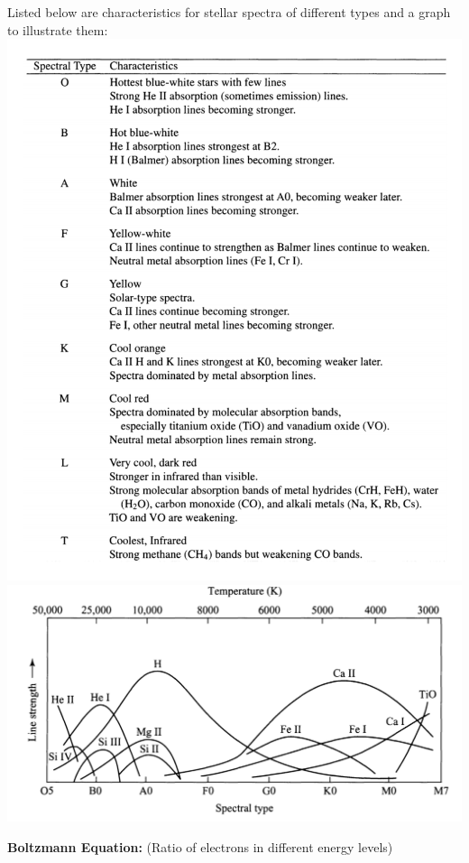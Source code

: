 \documentclass[12pt]{article}
\begin{document}
Listed below are characteristics for stellar spectra of different types and a graph to illustrate them:\newline
\includegraphics[scale=0.6]{Figures/SpectraClassification.png}
\newline
\includegraphics[scale=0.5]{Figures/LineStrengthChart.png}



\textbf{Boltzmann Equation:} (Ratio of electrons in different energy levels)
\end{document}
